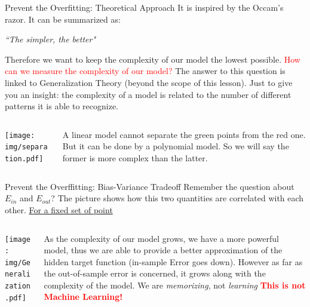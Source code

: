 \documentclass{beamer}
\begin{document}
\begin{frame}{Prevent the Overfitting: Theoretical Approach}
It is inspired by the Occam's razor. It can be summarized as:
\begin{center}
	\textit{``The simpler, the better"}
\end{center}
Therefore we want to keep the complexity of our model the lowest possible.
\pause
\textcolor{red}{How can we measure the complexity of our model?}
\pause
The answer to this question is linked to Generalization Theory (beyond the scope
of this lesson). Just to give you an insight: 
the complexity of a model is related to the number of different patterns
it is able to recognize.
\begin{columns}
	\begin{column}{0.5\textwidth}
    \begin{center}
    	\texttt{[image: img/separation.pdf]}
    \end{center}
	\end{column}
    \begin{column}{0.5\textwidth}
		A linear model cannot separate the green points from the red one. But it can be done
        by a polynomial model. So we will say the former is more complex than the latter.
	\end{column}
\end{columns}
\end{frame}


\begin{frame}{Prevent the Overffitting: Bias-Variance Tradeoff}
Remember the question about $E_{in}$ and $E_{out}$? The picture shows
how this two quantities are correlated with each other.
\vskip 0.3cm
\underline{For a fixed set of point}
\begin{columns}
	\begin{column}{0.5\textwidth}
	\texttt{[image: img/Generalization.pdf]}
	\end{column}
    \begin{column}{0.5\textwidth}
		As the complexity of our model grows, we have
        a more powerful model, thus we are able to provide a better approximation of the hidden target function (in-sample Error goes down).
        However as far as the out-of-sample error is concerned, it grows along with the
        complexity of the model.
        \pause
        \vskip 0.3cm
        We are \textit{memorizing}, not \textit{learning}
        \pause 
        \textcolor{red}{\textbf{This is not Machine Learning!}} 
	\end{column}
\end{columns}

\end{frame}
\end{document}
